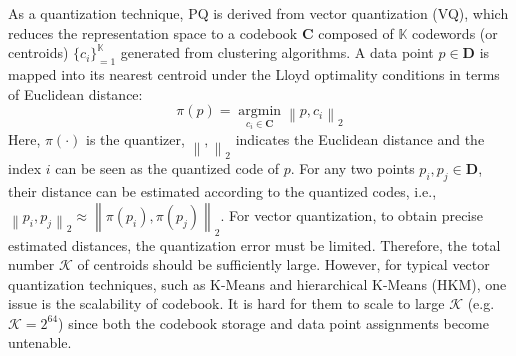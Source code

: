\documentclass[twocolumn]{svjour3}          %
\begin{document}
As a quantization technique, PQ is derived from vector quantization (VQ), which reduces the representation space to a codebook $\textbf{C}$ composed of $\mathbb{K}$ codewords (or centroids) $\{c_i\}_{=1}^\mathbb{K}$ generated from clustering algorithms. A data point $p\in \textbf{D}$ is mapped into its nearest centroid under the Lloyd optimality conditions in terms of Euclidean distance:
\begin{equation}
\label{eq:vqmap}
\pi \left( p \right) = \mathop {\arg \min }\limits_{{c_i} \in \textbf{C}} \left\| {p,{c_i}} \right\|_2
\end{equation}
Here, $\pi(\cdot)$ is the quantizer, $\left\|,\right\|_2$ indicates the Euclidean distance and the index $i$ can be seen as the quantized code of $p$. For any two points $p_i,p_j\in \textbf{D}$, their distance can be estimated according to the quantized codes, i.e., $\left\|{p_i,p_j}\right\|_2 \approx \left\|{\pi(p_i),\pi(p_j)}\right\|_2$. For vector quantization, to obtain precise estimated distances, the quantization error must be limited. Therefore, the total number $\mathcal{K}$ of centroids should be sufficiently large. However, for typical vector quantization techniques, such as K-Means and hierarchical K-Means (HKM), one issue is the scalability of codebook. It is hard for them to scale to large $\mathcal{K}$ (e.g. $\mathcal{K}=2^{64}$) since both the codebook storage and data point assignments become untenable.
\end{document}
